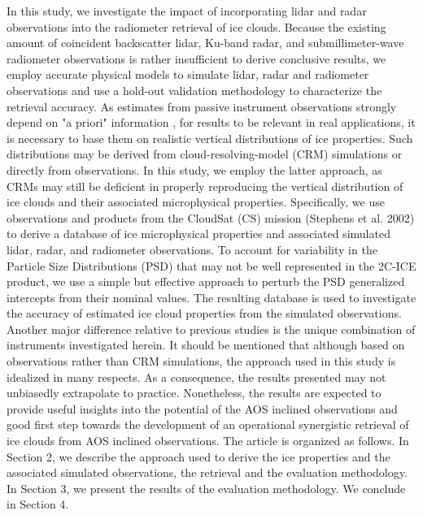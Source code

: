 \documentclass{ametsocV6.1}
\begin{document}
In this study, we investigate the impact of incorporating lidar and radar observations into the radiometer retrieval of ice clouds. Because the existing amount of coincident backscatter lidar, Ku-band radar, and submillimeter-wave  radiometer observations is rather insufficient to derive conclusive results, we employ accurate physical models to simulate lidar, radar and radiometer observations and use a hold-out validation methodology to characterize the retrieval accuracy. As estimates from passive instrument observations strongly depend on "a priori" information \citep{rodgers2000inverse}, for results to be relevant in real applications, it is necessary to base them on realistic vertical distributions of ice properties.  Such distributions may be derived from cloud-resolving-model (CRM) simulations \citep{pfreundschuh2020synergistic,liu2022assessing} or directly from observations.  In this study, we employ the latter approach, as CRMs may still be deficient in properly reproducing the vertical distribution of ice clouds and their associated microphysical properties.  Specifically, we use observations and products from the CloudSat (CS) mission (Stephens et al. 2002) to derive a database of ice microphysical properties and associated simulated lidar, radar, and radiometer observations.  To account for variability in the Particle Size Distributions (PSD) that may not be well represented in the 2C-ICE product, we use a simple but effective approach to perturb the PSD generalized intercepts from their nominal values. The resulting database is used to investigate the accuracy of estimated ice cloud properties from the simulated observations. Another major difference relative to previous studies is the unique combination of instruments investigated herein. It should be mentioned that although based on observations rather than CRM simulations, the approach used in this study is idealized in many respects. As a consequence, the results presented may not unbiasedly extrapolate to practice. Nonetheless, the results are expected to provide useful insights into the potential of the AOS inclined observations and good first step towards the development of an operational synergistic retrieval of ice clouds from AOS inclined observations. The article is organized as follows.  In Section 2, we describe the approach used to derive the ice properties and the associated simulated observations, the retrieval and the evaluation methodology.  In Section 3, we present the results of the evaluation methodology. We conclude in Section 4.
\end{document}
